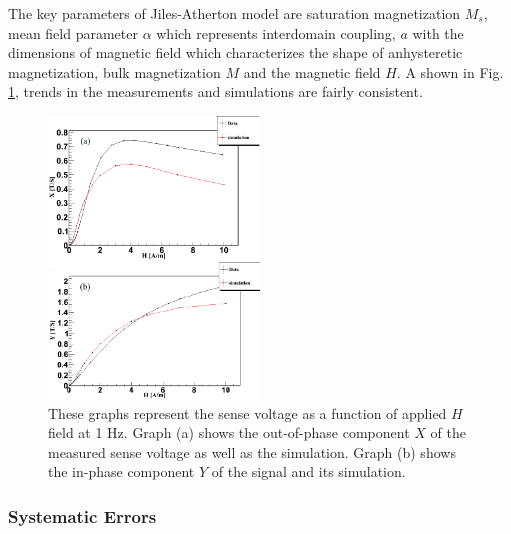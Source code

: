 The key parameters of Jiles-Atherton model are saturation
magnetization $M_s$, mean field parameter $\alpha$ which represents
interdomain coupling, $a$ with the dimensions of magnetic field which
characterizes the shape of anhysteretic magnetization, bulk
magnetization $M$ and the magnetic field $H$. A shown in
Fig. \ref{fig:data_and_simulation}, trends in the measurements and
simulations are fairly consistent.


\begin{figure}[h!]
\begin{center}
   \includegraphics[width=0.5\textwidth]{data_and_simulation3.PNG}
    \caption{These graphs represent the sense voltage as a function of applied $H$ field at 1 Hz. Graph (a) shows the out-of-phase component $X$ of the measured sense voltage as well as the simulation. Graph (b) shows the in-phase component $Y$ of the signal and its simulation.}
    \label{fig:data_and_simulation}
    \end{center}
\end{figure} 

\subsubsection{Systematic Errors}

%

